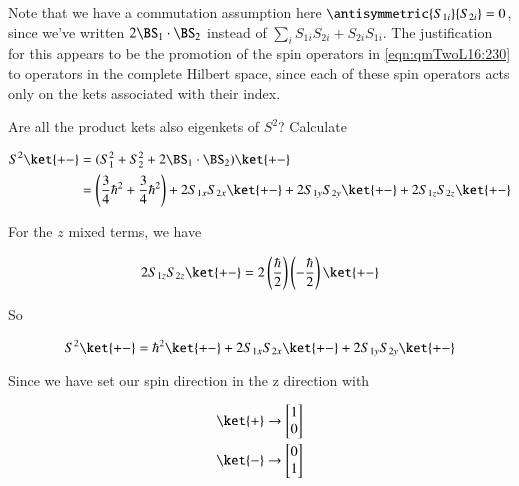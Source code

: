 Note that we have a commutation assumption here $\antisymmetric{S_{1i}}{S_{2i}} = 0$, since we've written $2 \BS_1 \cdot \BS_2$ instead of $\sum_i S_{1i}S_{2i} + S_{2i}S_{1i}$.  The justification for this appears to be the promotion of the spin operators in \ref{eqn:qmTwoL16:230} to operators in the complete Hilbert space, since each of these spin operators acts only on the kets associated with their index.

Are all the product kets also eigenkets of $S^2$?  Calculate

\begin{align*}
S^2 \ket{+-} 
&= 
(S_1^2 + S_2^2 + 2 \BS_1 \cdot \BS_2) \ket{+-} \\
&=
\left(\frac{3}{4}\hbar^2
+\frac{3}{4}\hbar^2\right)
+ 2 S_{1x} S_{2x} \ket{+-} 
+ 2 S_{1y} S_{2y} \ket{+-} 
+ 2 S_{1z} S_{2z} \ket{+-} 
\end{align*}

For the $z$ mixed terms, we have

\begin{equation}\label{eqn:qmTwoL16:370}
2 S_{1z} S_{2z} \ket{+-}  = 
2 
\left(\frac{\hbar}{2}\right)
\left(-\frac{\hbar}{2}\right)
\ket{+-}
\end{equation}

So

\begin{equation}\label{eqn:qmTwoL16:390}
S^2\ket{+-} = 
\hbar^2 \ket{+-} 
+ 2 S_{1x} S_{2x} \ket{+-} 
+ 2 S_{1y} S_{2y} \ket{+-} 
\end{equation}

Since we have set our spin direction in the z direction with

\begin{align}\label{eqn:qmTwoL16:410}
\ket{+} &\rightarrow 
\begin{bmatrix}
1 \\
0
\end{bmatrix} \\
\ket{-} &\rightarrow 
\begin{bmatrix}
0 \\
1 
\end{bmatrix}
\end{align}

